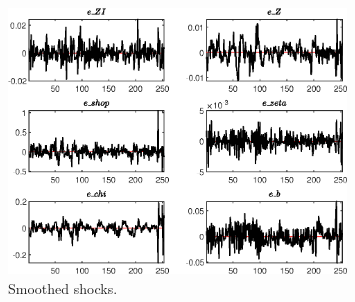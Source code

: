  
\begin{figure}[H]
\centering 
\includegraphics[width=0.80\textwidth]{directed_search/graphs/directed_search_SmoothedShocks1}
\caption{Smoothed shocks.}\label{Fig:SmoothedShocks:1}
\end{figure}


